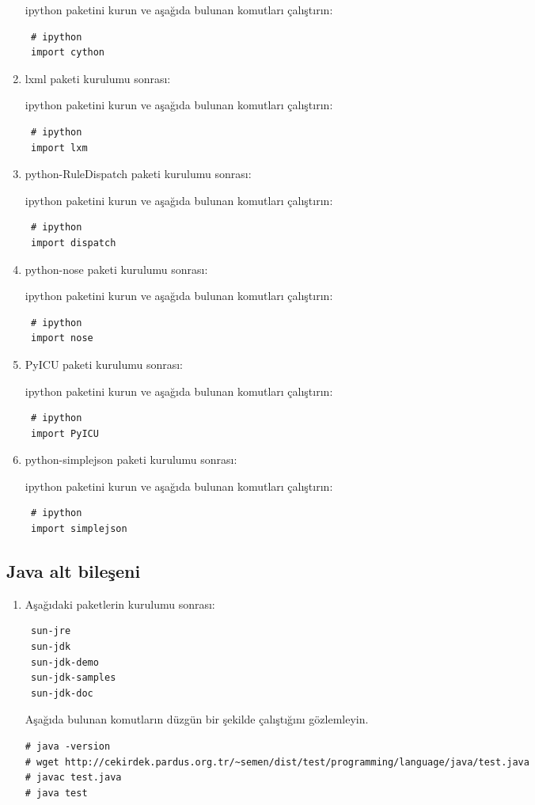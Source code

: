 \documentclass[a4paper,10pt]{article}
\begin{document}
\begin{enumerate}
ipython paketini kurun ve aşağıda bulunan komutları çalıştırın:
\begin{verbatim}
 # ipython
 import cython
\end{verbatim}

\item lxml paketi kurulumu sonrası:  

ipython paketini kurun ve aşağıda bulunan komutları çalıştırın:
\begin{verbatim}
 # ipython
 import lxm
\end{verbatim}
\item python-RuleDispatch paketi kurulumu sonrası:  

ipython paketini kurun ve aşağıda bulunan komutları çalıştırın:
\begin{verbatim}
 # ipython
 import dispatch
\end{verbatim}

\item python-nose paketi kurulumu sonrası:  

ipython paketini kurun ve aşağıda bulunan komutları çalıştırın:
\begin{verbatim}
 # ipython
 import nose
\end{verbatim}

\item PyICU paketi kurulumu sonrası:  

ipython paketini kurun ve aşağıda bulunan komutları çalıştırın:
\begin{verbatim}
 # ipython
 import PyICU
\end{verbatim}

\item python-simplejson paketi kurulumu sonrası:  

ipython paketini kurun ve aşağıda bulunan komutları çalıştırın:
\begin{verbatim}
 # ipython
 import simplejson
\end{verbatim}

\end{enumerate}

\subsection{Java alt bileşeni}
\begin{enumerate}
 \item Aşağıdaki paketlerin kurulumu sonrası:
\begin{verbatim}
 sun-jre
 sun-jdk
 sun-jdk-demo
 sun-jdk-samples
 sun-jdk-doc
\end{verbatim}

Aşağıda bulunan komutların düzgün bir şekilde çalıştığını gözlemleyin.
\begin{verbatim}
# java -version
# wget http://cekirdek.pardus.org.tr/~semen/dist/test/programming/language/java/test.java
# javac test.java
# java test
\end{verbatim}
\end{enumerate}
\end{document}
